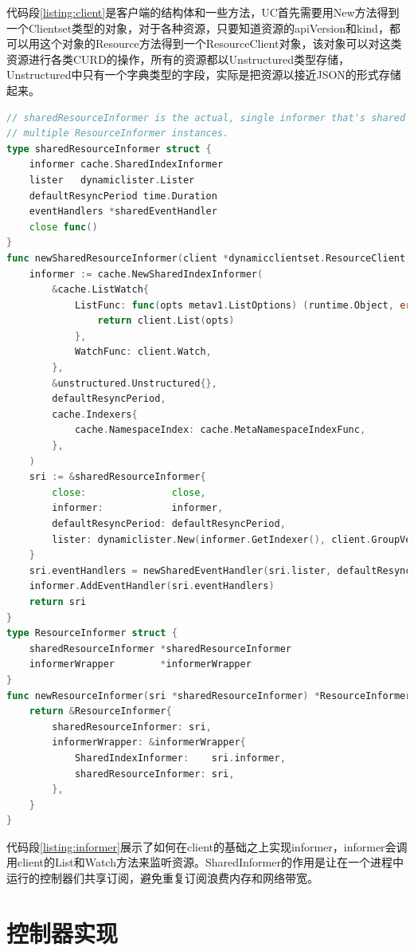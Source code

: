 \documentclass[macfonts,master]{njuthesis}
\begin{document}
代码段\ref{listing:client}是客户端的结构体和一些方法，UC首先需要用New方法得到一个Clientset类型的对象，对于各种资源，只要知道资源的apiVersion和kind，都可以用这个对象的Resource方法得到一个ResourceClient对象，该对象可以对这类资源进行各类CURD的操作，所有的资源都以Unstructured类型存储，Unstructured中只有一个字典类型的字段，实际是把资源以接近JSON的形式存储起来。

\begin{lstlisting}[language=Go,caption=通知器（Informer）实现,label=listing:informer]
// sharedResourceInformer is the actual, single informer that's shared by
// multiple ResourceInformer instances.
type sharedResourceInformer struct {
	informer cache.SharedIndexInformer
	lister   dynamiclister.Lister
	defaultResyncPeriod time.Duration
	eventHandlers *sharedEventHandler
	close func()
}
func newSharedResourceInformer(client *dynamicclientset.ResourceClient, defaultResyncPeriod time.Duration, close func()) *sharedResourceInformer {
	informer := cache.NewSharedIndexInformer(
		&cache.ListWatch{
			ListFunc: func(opts metav1.ListOptions) (runtime.Object, error) {
				return client.List(opts)
			},
			WatchFunc: client.Watch,
		},
		&unstructured.Unstructured{},
		defaultResyncPeriod,
		cache.Indexers{
			cache.NamespaceIndex: cache.MetaNamespaceIndexFunc,
		},
	)
	sri := &sharedResourceInformer{
		close:               close,
		informer:            informer,
		defaultResyncPeriod: defaultResyncPeriod,
		lister: dynamiclister.New(informer.GetIndexer(), client.GroupVersionResource()),
	}
	sri.eventHandlers = newSharedEventHandler(sri.lister, defaultResyncPeriod)
	informer.AddEventHandler(sri.eventHandlers)
	return sri
}
type ResourceInformer struct {
	sharedResourceInformer *sharedResourceInformer
	informerWrapper        *informerWrapper
}
func newResourceInformer(sri *sharedResourceInformer) *ResourceInformer {
	return &ResourceInformer{
		sharedResourceInformer: sri,
		informerWrapper: &informerWrapper{
			SharedIndexInformer:    sri.informer,
			sharedResourceInformer: sri,
		},
	}
}
\end{lstlisting}

代码段\ref{listing:informer}展示了如何在client的基础之上实现informer，informer会调用client的List和Watch方法来监听资源。SharedInformer的作用是让在一个进程中运行的控制器们共享订阅，避免重复订阅浪费内存和网络带宽。

\section{控制器实现}
\end{document}
